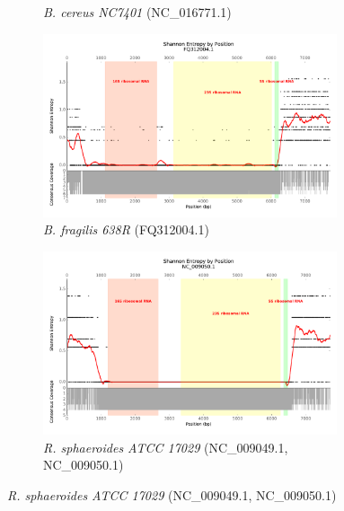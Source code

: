 \documentclass[10pt]{article}
\begin{document}
\begin{figure}[h]
\begin{subfigure}[b]{.45\textwidth}
    \caption{\textit{B. cereus NC7401} (NC\_016771.1)}
    \label{fig:ent_cereus_nc}
  \end{subfigure}
  \begin{subfigure}[b]{.45\textwidth}
    \includegraphics[width=0.95\textwidth]{gage_entropy_figures/FQ312004.1_entropy_plot}
    \caption{\textit{B. fragilis 638R} (FQ312004.1)}
    \label{fig:ent_frag}
  \end{subfigure}
  \begin{subfigure}[b]{.45\textwidth}
    \includegraphics[width=0.95\textwidth]{gage_entropy_figures/NC_009050.1_entropy_plot}
    \caption{\textit{R. sphaeroides  ATCC 17029} (NC\_009049.1, NC\_009050.1)}
    \label{fig:ent_rhodo}
  \end{subfigure}
\end{figure}
\end{document}
